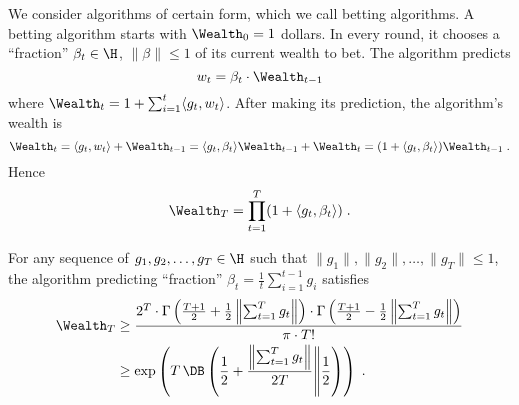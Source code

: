 We consider algorithms of certain form, which we call betting algorithms.  A
betting algorithm starts with $\Wealth_0 = 1$ dollars.
In every round, it chooses a ``fraction'' $\beta_t \in \H$, $\|\beta\| \le 1$
of its current wealth to bet. The algorithm predicts
$$
w_t = \beta_t \cdot \Wealth_{t-1}
$$
where $\Wealth_t = 1 + \sum_{i=1}^t \langle g_t, w_t \rangle$. After making its prediction,
the algorithm's wealth is
$$
\Wealth_t = \langle g_t, w_t \rangle + \Wealth_{t-1} = \langle g_t, \beta_t \rangle \Wealth_{t-1} + \Wealth_t = (1 + \langle g_t, \beta_t \rangle) \Wealth_{t-1} \; .
$$
Hence
$$
\Wealth_T = \prod_{t=1}^T (1 + \langle g_t, \beta_t \rangle) \; .
$$









\begin{theorem}
\label{theo:wealth}
For any sequence of $g_1, g_2, \dots, g_T \in \H$ such that $\|g_1\|, \|g_2\|,
\dots, \|g_T\| \le 1$, the algorithm predicting ``fraction'' $\beta_t =
\frac{1}{t} \sum_{i=1}^{t-1} g_i$ satisfies
\begin{align*}
\Wealth_T
&\geq \frac{2^T \cdot \Gamma \left(\frac{T+1}{2} + \frac{1}{2}\left\|\sum_{t=1}^T g_t \right\| \right) \cdot \Gamma \left(\frac{T+1}{2} - \frac{1}{2} \left\|\sum_{t=1}^T g_t \right\| \right)}{\pi \cdot T!} \\
&\geq \exp\left(T \, \DB\left(\frac{1}{2} +\frac{\left\|\sum_{t=1}^T g_t \right\|}{2T}\middle\| \frac{1}{2}\right)\right)
\; .
\end{align*}
\end{theorem}
